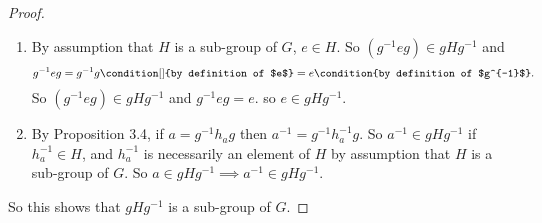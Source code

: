 \documentclass{article}
\theoremstyle{definition}
\newcommand{\inv}[1]{#1^{-1}}
\begin{document}
\begin{singlespace}
\begin{proof}
\begin{enumerate}
			\item By assumption that $H$ is a sub-group of $G$, $e\in H$. So $\left(\inv{g}eg\right)\in gH\inv{g}$ and \begin{dmath*}
				\inv{g}eg = \inv{g}g \condition[]{by definition of $e$} = e \condition{by definition of $\inv{g}$}.
			\end{dmath*} So $\left(\inv{g}eg\right)\in gH\inv{g}$ and $\inv{g}eg=e$. so $e\in gH\inv{g}$. 
			
			\item By Proposition 3.4, if $a=\inv{g}h_ag$ then $\inv{a}=\inv{g}\inv{h_a}g$. So $\inv{a}\in gH\inv{g}$ if $\inv{h_a}\in H$, and $\inv{h_a}$ is necessarily an element of $H$ by assumption that $H$ is a sub-group of $G$. So $a\in gH\inv{g}\implies \inv{a}\in gH\inv{g}$. 
		\end{enumerate} So this shows that $gH\inv{g}$ is a sub-group of $G$. 
	\end{proof}

	\end{singlespace}
\end{document}
